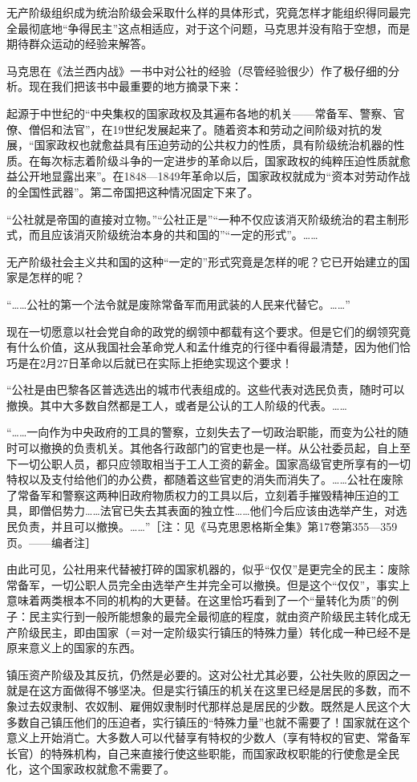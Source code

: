 \documentclass[UTF8, 12pt, a4paper]{ctexrep}
\begin{document}
无产阶级组织成为统治阶级会采取什么样的具体形式，究竟怎样才能组织得同最完全最彻底地“争得民主”这点相适应，对于这个问题，马克思并没有陷于空想，而是期待群众运动的经验来解答。

马克思在《法兰西内战》一书中对公社的经验（尽管经验很少）作了极仔细的分析。现在我们把该书中最重要的地方摘录下来：

起源于中世纪的“中央集权的国家政权及其遍布各地的机关——常备军、警察、官僚、僧侣和法官”，在19世纪发展起来了。随着资本和劳动之间阶级对抗的发展，“国家政权也就愈益具有压迫劳动的公共权力的性质，具有阶级统治机器的性质。在每次标志着阶级斗争的一定进步的革命以后，国家政权的纯粹压迫性质就愈益公开地显露出来”。在1848—1849年革命以后，国家政权就成为“资本对劳动作战的全国性武器”。第二帝国把这种情况固定下来了。

“公社就是帝国的直接对立物。”“公社正是”“一种不仅应该消灭阶级统治的君主制形式，而且应该消灭阶级统治本身的共和国的”“一定的形式”。……

无产阶级社会主义共和国的这种“一定的”形式究竟是怎样的呢？它已开始建立的国家是怎样的呢？

“……公社的第一个法令就是废除常备军而用武装的人民来代替它。……”

现在一切愿意以社会党自命的政党的纲领中都载有这个要求。但是它们的纲领究竟有什么价值，这从我国社会革命党人和孟什维克的行径中看得最清楚，因为他们恰巧是在2月27日革命以后就已在实际上拒绝实现这个要求！

“公社是由巴黎各区普选选出的城市代表组成的。这些代表对选民负责，随时可以撤换。其中大多数自然都是工人，或者是公认的工人阶级的代表。……

“……一向作为中央政府的工具的警察，立刻失去了一切政治职能，而变为公社的随时可以撤换的负责机关。其他各行政部门的官吏也是一样。从公社委员起，自上至下一切公职人员，都只应领取相当于工人工资的薪金。国家高级官吏所享有的一切特权以及支付给他们的办公费，都随着这些官吏的消失而消失了。……公社在废除了常备军和警察这两种旧政府物质权力的工具以后，立刻着手摧毁精神压迫的工具，即僧侣势力……法官已失去其表面的独立性……他们今后应该由选举产生，对选民负责，并且可以撤换。……”［注：见《马克思恩格斯全集》第17卷第355—359页。——编者注］

由此可见，公社用来代替被打碎的国家机器的，似乎“仅仅”是更完全的民主：废除常备军，一切公职人员完全由选举产生并完全可以撤换。但是这个“仅仅”，事实上意味着两类根本不同的机构的大更替。在这里恰巧看到了一个“量转化为质”的例子：民主实行到一般所能想象的最完全最彻底的程度，就由资产阶级民主转化成无产阶级民主，即由国家（＝对一定阶级实行镇压的特殊力量）转化成一种已经不是原来意义上的国家的东西。

镇压资产阶级及其反抗，仍然是必要的。这对公社尤其必要，公社失败的原因之一就是在这方面做得不够坚决。但是实行镇压的机关在这里已经是居民的多数，而不象过去奴隶制、农奴制、雇佣奴隶制时代那样总是居民的少数。既然是人民这个大多数自己镇压他们的压迫者，实行镇压的“特殊力量”也就不需要了！国家就在这个意义上开始消亡。大多数人可以代替享有特权的少数人（享有特权的官吏、常备军长官）的特殊机构，自己来直接行使这些职能，而国家政权职能的行使愈是全民化，这个国家政权就愈不需要了。
\end{document}
